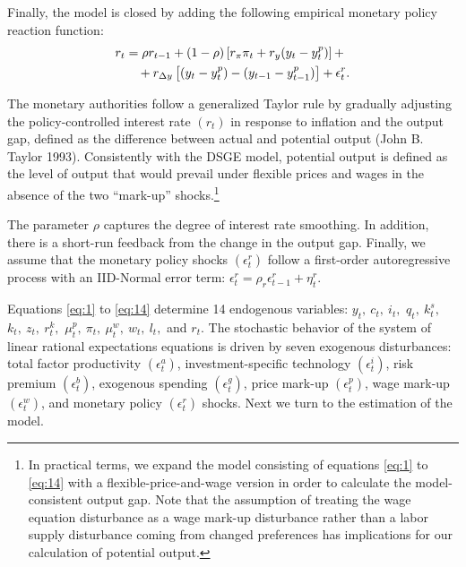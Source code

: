 \documentclass[11pt]{article}
\newcommand{\yobs}[1]{y_{#1}}
\newcommand{\robs}[1]{r_{#1}}
\newcommand{\piobs}[1]{\pi_{#1}}
\newcommand{\youtput}{output}
\newcommand{\labor}{labor}
\newcommand{\interest}{interest rate}
\newcommand{\wage}{wage}
\newcommand{\wages}{wages}
\newcommand{\price}{price}
\newcommand{\prices}{prices}
\newcommand{\inflation}{inflation}
\begin{document}
Finally, the model is closed by adding the following empirical monetary
policy reaction function: \begin{align}
  \label{eq:14}
  \robs{t} &= \rho\robs{t-1} + (1-\rho)\left[r_\pi \piobs{t} +
  r_y(\yobs{t}-\yobs{t}^p)\right]+\\ &\quad + r_{\Delta y}\left[(\yobs{t}-\yobs{t}^{p}) -
  (\yobs{t-1} - \yobs{t-1}^{p})\right] + \epsilon_t^r.\notag
\end{align}

The monetary authorities follow a generalized Taylor rule by gradually
adjusting the policy-controlled \interest{} \((\robs{t})\) in response
to \inflation{} and the \youtput{} gap, defined as the difference
between actual and potential \youtput{} (John B. Taylor 1993).
Consistently with the DSGE model, potential \youtput{} is defined as the
level of \youtput{} that would prevail under flexible \prices{} and
\wages{} in the absence of the two ``mark-up''
shocks.\footnote{In practical
  terms, we expand the model consisting of equations \eqref{eq:1} to
  \eqref{eq:14} with a flexible-\price-and-\wage{} version in order to
  calculate the model-consistent \youtput{} gap. Note that the assumption
  of treating the \wage{} equation disturbance as a \wage{} mark-up
  disturbance rather than a \labor{} supply disturbance coming from
  changed preferences has implications for our calculation of
  potential \youtput{}. }

The parameter \(\rho\) captures the degree of \interest{} smoothing. In
addition, there is a short-run feedback from the change in the
\youtput{} gap. Finally, we assume that the monetary policy shocks
\((\epsilon_t^r)\) follow a first-order autoregressive process with an
IID-Normal error term:
\(\epsilon_t^r = \rho_r\epsilon_{t-1}^r + \eta_t^r\).

Equations \eqref{eq:1} to \eqref{eq:14} determine 14 endogenous
variables: \(y_t,\ c_t,\ i_t,\) \(q_t,\ k_t^s,\) \(k_t,\ z_t,\ r_t^k,\)
\(\mu_t^p,\ \pi_t,\ \mu_t^w,\ w_t,\ l_t,\) and \(r_t\). The stochastic
behavior of the system of linear rational expectations equations is
driven by seven exogenous disturbances: total factor productivity
\((\epsilon^a_t)\), investment-specific technology \((\epsilon^i_t)\),
risk premium \((\epsilon_t^b)\), exogenous spending \((\epsilon_t^g)\),
\price{} mark-up \((\epsilon_t^p)\), \wage{} mark-up \((\epsilon_t^w)\),
and monetary policy \((\epsilon_t^r)\) shocks. Next we turn to the
estimation of the model.





\end{document}
